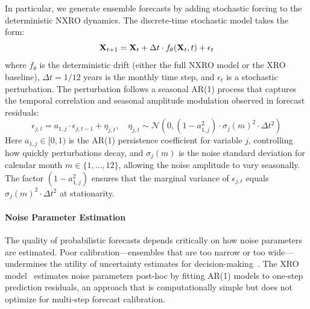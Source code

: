In particular, we generate ensemble forecasts by adding stochastic forcing to the deterministic NXRO dynamics. The discrete-time stochastic model takes the form:
\begin{equation}
    \mathbf{X}_{t+1} = \mathbf{X}_t + \Delta t \cdot f_\theta(\mathbf{X}_t, t) + \epsilon_t
    \label{eq:stochastic_model}
\end{equation}
where $f_\theta$ is the deterministic drift (either the full NXRO model or the XRO baseline), $\Delta t = 1/12$ years is the monthly time step, and $\epsilon_t$ is a stochastic perturbation. The perturbation follows a seasonal AR(1) process that captures the temporal correlation and seasonal amplitude modulation observed in forecast residuals:
\begin{equation}
    \epsilon_{j,t} = a_{1,j} \cdot \epsilon_{j,t-1} + \eta_{j,t}, \quad \eta_{j,t} \sim \mathcal{N}(0, (1 - a_{1,j}^2) \cdot \sigma_j(m)^2 \cdot \Delta t^2)
    \label{eq:ar1_noise}
\end{equation}
Here $a_{1,j} \in [0, 1)$ is the AR(1) persistence coefficient for variable $j$, controlling how quickly perturbations decay, and $\sigma_j(m)$ is the noise standard deviation for calendar month $m \in \{1, \ldots, 12\}$, allowing the noise amplitude to vary seasonally. The factor $(1 - a_{1,j}^2)$ ensures that the marginal variance of $\epsilon_{j,t}$ equals $\sigma_j(m)^2 \cdot \Delta t^2$ at stationarity.


\paragraph{Noise Parameter Estimation}

The quality of probabilistic forecasts depends critically on how noise parameters are estimated. Poor calibration---ensembles that are too narrow or too wide---undermines the utility of uncertainty estimates for decision-making~\cite{vannitsem2021statistical}. The XRO model~\cite{zhao2024xro} estimates noise parameters post-hoc by fitting AR(1) models to one-step prediction residuals, an approach that is computationally simple but does not optimize for multi-step forecast calibration. 

